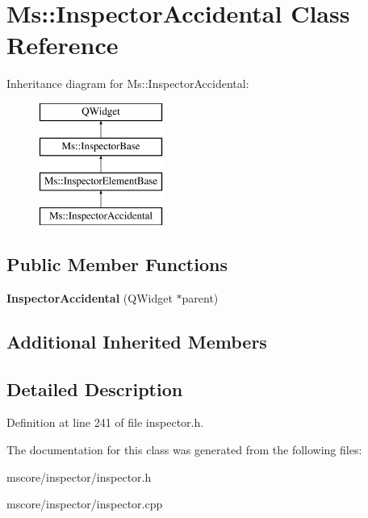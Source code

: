 \hypertarget{class_ms_1_1_inspector_accidental}{}\section{Ms\+:\+:Inspector\+Accidental Class Reference}
\label{class_ms_1_1_inspector_accidental}
Inheritance diagram for Ms\+:\+:Inspector\+Accidental\+:\begin{figure}[H]
\begin{center}
\leavevmode
\includegraphics[height=4.000000cm]{class_ms_1_1_inspector_accidental}
\end{center}
\end{figure}
\subsection*{Public Member Functions}
\begin{DoxyCompactItemize}
\item 
\mbox{\label{class_ms_1_1_inspector_accidental_a73d2301f8754c79760c5a2632571d678}} 
{\bfseries Inspector\+Accidental} (Q\+Widget $\ast$parent)
\end{DoxyCompactItemize}
\subsection*{Additional Inherited Members}


\subsection{Detailed Description}


Definition at line 241 of file inspector.\+h.



The documentation for this class was generated from the following files\+:\begin{DoxyCompactItemize}
\item 
mscore/inspector/inspector.\+h\item 
mscore/inspector/inspector.\+cpp\end{DoxyCompactItemize}
